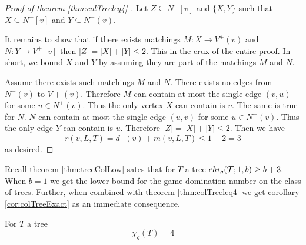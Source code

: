 \begin{proof}[Proof of theorem \ref{thm:colTreeleq4} \cite{KIERSTEAD2000}]
    Let $Z\subseteq N^-[v]$ and $\{X,Y\}$ such that $X\subseteq N^-[v]$ and $Y\subseteq N^-(v)$. 
    
    It remains to show that if there exists matchings $M:X\to V^+(v)$ and $N:Y\to V^+[v]$ then $|Z| = |X|+|Y| \leq 2$. This in the crux of the entire proof. In short, we bound $X$ and $Y$ by assuming they are part of the matchings $M$ and $N$.
    
    Assume there exists such matchings $M$ and $N$. There exists no edges from $N^-(v)$ to $V+(v)$. Therefore $M$ can contain at most the single edge $(v,u)$ for some $u\in N^+(v)$. Thus the only vertex $X$ can contain is $v$.    
    The same is true for $N$. $N$ can contain at most the single edge $(u,v)$ for some $u\in N^+(v)$. Thus the only edge $Y$ can contain is $u$. Therefore $|Z| = |X|+|Y|\leq 2$.    
    Then we have \[r(v,L,T) = d^+(v)+m(v,L,T) \leq 1 + 2 =3\] as desired.
\end{proof}

Recall theorem \ref{thm:treeColLow} sates that for $T$ a tree $chi_g(\mathcal{T};1,b) \geq b+3 $. When $b=1$ we get the lower bound for the game domination number on the class of trees. Further, when combined with theorem \ref{thm:colTreeleq4} we get corollary \ref{cor:colTreeExact} as an immediate consequence.  

\begin{corollary} \label{cor:colTreeExact}
    For $T$ a tree \[\chi_g(T) = 4\]
\end{corollary}

